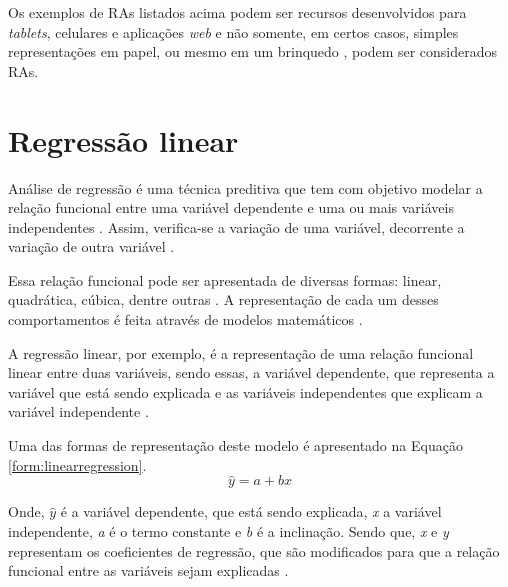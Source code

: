 
\par Os exemplos de RAs listados acima podem ser recursos desenvolvidos para \textit{tablets}, celulares e aplicações \textit{web} e não somente, em certos casos, simples representações em papel, ou mesmo em um brinquedo \cite{Bersch2017}, podem ser considerados RAs.

\section{Regressão linear}

\par Análise de regressão é uma técnica preditiva \cite{introDataMining2009} que tem com objetivo modelar a relação funcional entre uma variável dependente e uma ou mais variáveis independentes \cite{Peternelli2003}. Assim, verifica-se a variação de uma variável, decorrente a variação de outra variável \cite{Peternelli2003, mannprems2006}.

\par Essa relação funcional pode ser apresentada de diversas formas: linear, quadrática, cúbica, dentre outras \cite{Peternelli2003}. A representação de cada um desses comportamentos é feita através de modelos matemáticos \cite{mannprems2006}.

\par A regressão linear, por exemplo, é a representação de uma relação funcional linear entre duas variáveis, sendo essas, a variável dependente, que representa a variável que está sendo explicada e as variáveis independentes que explicam a variável independente \cite{mannprems2006}. 

\par Uma das formas de representação deste modelo é apresentado na Equação \ref{form:linearregression}. 
\begin{equation}
    \widehat{y} = a + bx
\label{form:linearregression}
\end{equation}

\par Onde, $ \widehat{y} $ é a variável dependente, que está sendo explicada, \textit{x} a variável independente, \textit{a} é o termo constante e \textit{b} é a inclinação. Sendo que, \textit{x} e \textit{y} representam os coeficientes de regressão, que são modificados para que a relação funcional entre as variáveis sejam explicadas \cite{introDataMining2009}.

